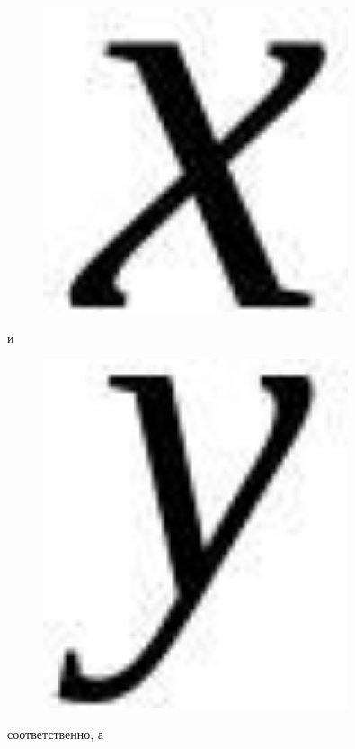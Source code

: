 \begin{figure}[H]
	\centering
	\includegraphics[width=0.8\textwidth]{assets/98}
	\caption*{}
\end{figure} и
\begin{figure}[H]
	\centering
	\includegraphics[width=0.8\textwidth]{assets/99}
	\caption*{}
\end{figure}соответственно, а
